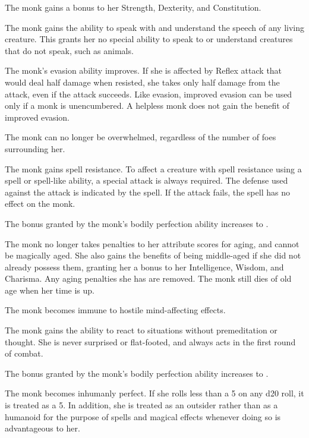  The monk gains a  bonus to her Strength, Dexterity, and Constitution.

 The monk gains the ability to speak with and understand the speech of any living creature. This grants her no special ability to speak to or understand creatures that do not speak, such as animals.

 The monk's evasion ability improves. If she is affected by Reflex attack that would deal half damage when resisted, she takes only half damage from the attack, even if the attack succeeds. Like evasion, improved evasion can be used only if a monk is unencumbered. A helpless monk does not gain the benefit of improved evasion.

 The monk can no longer be overwhelmed, regardless of the number of foes surrounding her.

 The monk gains spell resistance. To affect a creature with spell resistance using a spell or spell-like ability, a special attack is always required. The defense used against the attack is indicated by the spell. If the attack fails, the spell has no effect on the monk.

 The bonus granted by the monk's bodily perfection ability increases to .

 The monk no longer takes penalties to her attribute scores for aging, and cannot be magically aged. She also gains the benefits of being middle-aged if she did not already possess them, granting her a  bonus to her Intelligence, Wisdom, and Charisma. Any aging penalties she has are removed. The monk still dies of old age when her time is up.

 The monk becomes immune to hostile mind-affecting effects.

 The monk gains the ability to react to situations without premeditation or thought. She is never surprised or flat-footed, and always acts in the first round of combat.

 The bonus granted by the monk's bodily perfection ability increases to .

 The monk becomes inhumanly perfect. If she rolls less than a 5 on any d20 roll, it is treated as a 5. In addition, she is treated as an outsider rather than as a humanoid for the purpose of spells and magical effects whenever doing so is advantageous to her.

